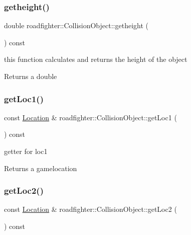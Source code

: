 \mbox{\label{classroadfighter_1_1CollisionObject_a0c83b40afb7be4ed3b501a79c2a81b9b}} 
\subsubsection{\texorpdfstring{getheight()}{getheight()}}
{\footnotesize\ttfamily double roadfighter\+::\+Collision\+Object\+::getheight (\begin{DoxyParamCaption}{ }\end{DoxyParamCaption}) const}

this function calculates and returns the height of the object \begin{DoxyReturn}{Returns}
a double 
\end{DoxyReturn}
\mbox{\label{classroadfighter_1_1CollisionObject_a73baa1faea7a399a944e6a6f1d04ad86}} 
\subsubsection{\texorpdfstring{get\+Loc1()}{getLoc1()}}
{\footnotesize\ttfamily const \hyperlink{classroadfighter_1_1Location}{Location} \& roadfighter\+::\+Collision\+Object\+::get\+Loc1 (\begin{DoxyParamCaption}{ }\end{DoxyParamCaption}) const}

getter for loc1 \begin{DoxyReturn}{Returns}
a gamelocation 
\end{DoxyReturn}
\mbox{\label{classroadfighter_1_1CollisionObject_aa7412cf56663bc98b1454a8ae54ac2b0}} 
\subsubsection{\texorpdfstring{get\+Loc2()}{getLoc2()}}
{\footnotesize\ttfamily const \hyperlink{classroadfighter_1_1Location}{Location} \& roadfighter\+::\+Collision\+Object\+::get\+Loc2 (\begin{DoxyParamCaption}{ }\end{DoxyParamCaption}) const}

